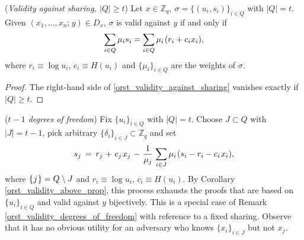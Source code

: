 \documentclass{iacrtrans}
\begin{document}
\begin{cor}\label{orst_validity_above_prop}
\textup{(\textit{Validity against sharing, $|Q| \ge t$})}
Let $x \in \mathbb{Z}_q,\ \sigma = \{(u_i, s_i)\}_{i \in Q}$
with $|Q| = t$.
Given $(x_1, \dots, x_n;\hspace{1pt} y) \in D_x$,
$\sigma$ is valid against $y$ if and only if
\vspace{5pt}
\begin{equation}\label{orst_validity_above}
\sum_{i \in Q} \mu_i s_i =
\sum_{i \in Q} \mu_i\hspace{1pt}(r_i + c_i x_i),
\vspace{5pt}
\end{equation}
where $r_i \equiv \log u_i$, $c_i \equiv H(u_i)$
and $\{\mu_i\}_{i \in Q}$
are the weights of $\sigma$.
\end{cor}
\begin{proof}
The right-hand side of \eqref{orst_validity_against_sharing}
vanishes exactly if $|Q| \ge t$.
\end{proof}

\begin{rem}\label{orst_t_1_degrees_of_freedom}
(\textit{$t-1$ degrees of freedom})
Fix $\{u_i\}_{i \in Q}$ with $|Q| = t$.
Choose $J \subset Q$ with $|J| = t - 1$,
pick arbitrary $\{\delta_i\}_{i \in J} \subset \mathbb{Z}_q$
and set
\vspace{5pt}
\begin{equation*}
s_j
	\hspace{2pt}
	=
	\hspace{2pt}
	r_j
	\hspace{1pt}
	+
	\hspace{1pt}
	c_j\hspace{1pt}x_j
	\hspace{1pt}
	-
	\hspace{1pt}
	\frac{1}{\mu_j}
	\hspace{1pt}
	\sum_{i \in J}
		\mu_i
		\hspace{1pt}
		(
			s_i - r_i - c_i\hspace{1pt}x_i
		),
\vspace{5pt}
\end{equation*}
where $\{\hspace{0.5pt}j\hspace{0.5pt}\} = Q \setminus J$ and
$r_i \equiv \log u_i$, $c_i \equiv H(u_i)$.
By Corollary \ref{orst_validity_above_prop},
this process exhausts the proofs
that are based on $\{u_i\}_{i \in Q}$
and valid against $y$ bijectively.
This is a special case of Remark
\ref{orst_validity_degrees_of_freedom}
with reference to a fixed sharing.
Observe that it has no obvious utility
for an adversary who knows $\{x_i\}_{i \in J}$
but not $x_j$.
\end{rem}
\end{document}
